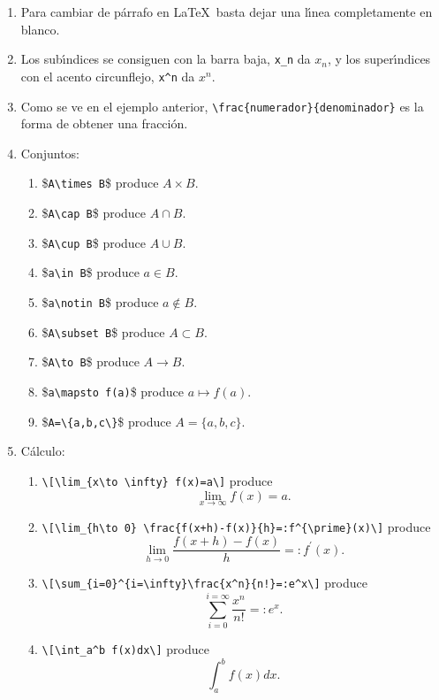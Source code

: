 \begin{appendices}
\begin{enumerate}
Esto es lo que hace que aprender a escribir c\'odigo {\LaTeX} sea muy sencillo
para personas acostumbradas a leer texto matem\'atico. 

\item Para cambiar de p\'arrafo en \LaTeX\ basta dejar una l\'{\i}nea
completamente en blanco. 

\item Los sub\'{\i}ndices se consiguen con la barra baja, \verb|x_n| da $x_n$, 
y los super\'{\i}ndices con el acento circunflejo, \verb|x^n| da $x^n$.

\item Como se ve en el ejemplo anterior,  \verb|\frac{numerador}{denominador}|
es
la forma de obtener una fracci\'on.

\item Conjuntos:
\begin{enumerate}
\item \$\lstinline[language={[LaTeX]TeX}]|A\times B|\$ 
produce $A\times B$.
\item \$\lstinline[language={[LaTeX]TeX}]|A\cap B|\$ 
produce $A\cap B$.
\item \$\lstinline[language={[LaTeX]TeX}]|A\cup B|\$ 
produce $A\cup B$.
\item \$\lstinline[language={[LaTeX]TeX}]|a\in B|\$ 
produce $a\in B$.
\item \$\lstinline[language={[LaTeX]TeX}]|a\notin B|\$ 
produce $a\notin B$.
\item \$\lstinline[language={[LaTeX]TeX}]|A\subset B|\$ 
produce $A\subset B$.
\item \$\lstinline[language={[LaTeX]TeX}]|A\to B|\$ 
produce $A\to B$.
\item \$\lstinline[language={[LaTeX]TeX}]|a\mapsto f(a)|\$ 
produce $a\mapsto f(a)$.

\item \$\lstinline|A=\{a,b,c\}|\$
produce $A=\{a,b,c\}$.
\end{enumerate}

\item C\'alculo:
\begin{enumerate}
\item \verb|\[\lim_{x\to \infty} f(x)=a\]| produce \[\lim_{x\to \infty}
f(x)=a.\]
\item \verb|\[\lim_{h\to 0} \frac{f(x+h)-f(x)}{h}=:f^{\prime}(x)\]| produce 
 \[\lim_{h\to 0} \frac{f(x+h)-f(x)}{h}=:f^{\prime}(x).\]
\item \verb|\[\sum_{i=0}^{i=\infty}\frac{x^n}{n!}=:e^x\]| produce
\[\sum_{i=0}^{i=\infty}\frac{x^n}{n!}=:e^x.\]
\item \verb|\[\int_a^b f(x)dx\]| produce 
\[\int_a^b f(x)dx.\]


\end{enumerate}
\end{enumerate}
\end{appendices}
